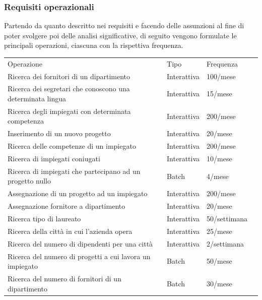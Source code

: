 \documentclass{article}
\begin{document}
\subsubsection{Requisiti operazionali}
Partendo da quanto descritto nei requisiti e facendo delle assunzioni al fine di poter svolgere poi delle analisi significative, di seguito vengono formulate le principali operazioni, ciascuna con la rispettiva frequenza.
\begin{table}[H]
\renewcommand{\arraystretch}{1.5}
\centering
\begin{tabular}{|p{}|l|l|l|}
\cline{1-3}
Operazione & Tipo & Frequenza\\ \cline{1-3}
Ricerca dei fornitori di un dipartimento & Interattiva & 100/mese \\ \cline{1-3}
Ricerca dei segretari che conoscono una determinata lingua & Interattiva & 15/mese\\ \cline{1-3}
Ricerca degli impiegati con determinata competenza & Interattiva & 200/mese \\ \cline{1-3}
Inserimento di un nuovo progetto & Interattiva & 20/mese \\ \cline{1-3}
Ricerca delle competenze di un impiegato & Interattiva & 200/mese \\ \cline{1-3}
Ricerca di impiegati coniugati & Interattiva & 10/mese \\ \cline{1-3}
Ricerca di impiegati che partecipano ad un progetto nullo & Batch & 4/mese \\ \cline{1-3}
Assegnazione di un progetto ad un impiegato & Interattiva & 200/mese \\ \cline{1-3}
Assegnazione fornitore a dipartimento & Interattiva & 20/mese \\ \cline{1-3}
Ricerca tipo di laureato & Interattiva & 50/settimana \\ \cline{1-3}
Ricerca della città in cui l'azienda opera & Interattiva & 25/mese \\ \cline{1-3}
Ricerca del numero di dipendenti per una città & Interattiva & 2/settimana \\ \cline{1-3}
Ricerca del numero di progetti a cui lavora un impiegato & Batch & 50/mese \\ \cline{1-3}
Ricerca del numero di fornitori di un dipartimento & Batch & 30/mese \\ \cline{1-3}
\end{tabular}
\end{table}
\end{document}
